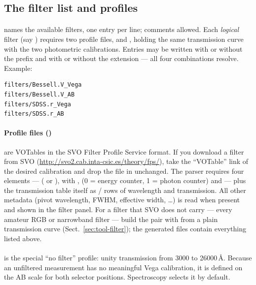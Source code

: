 \subsection{The filter list and profiles}
\label{sec:file-filters}

\paragraph{} names the available filters, one
entry per line; \code{\#} comments allowed. Each \emph{logical} filter
(say ) requires two profile files, 
and , holding the same transmission curve with the two
photometric calibrations. Entries may be written with or without the
 prefix and with or without the  extension ---
all four combinations resolve. Example:

\begin{verbatim}
filters/Bessell.V_Vega
filters/Bessell.V_AB
filters/SDSS.r_Vega
filters/SDSS.r_AB
\end{verbatim}

\paragraph{Profile files ()} are VOTables in the
SVO Filter Profile Service format. If you download a filter from SVO
(\url{http://svo2.cab.inta-csic.es/theory/fps/}), take the ``VOTable''
link of the desired calibration and drop the file in unchanged. The
parser requires four  elements ---  (
or ),  with  ,
 (0 = energy counter, 1 = photon counter) and
 --- plus the transmission table itself as
/ rows of wavelength and transmission. All other
metadata (pivot wavelength, FWHM, effective width, \dots) is read when
present and shown in the filter panel. For a filter that SVO does not
carry --- every amateur RGB or narrowband filter --- build the pair with
 from a plain transmission curve
(Sect.~\ref{sec:tool-filter}); the generated files contain everything
listed above.

\paragraph{} is the special ``no filter'' profile: unity
transmission from 3000 to 26000\,\AA{}. Because an unfiltered measurement
has no meaningful Vega calibration, it is defined on the AB scale for
both selector positions. Spectroscopy selects it by default.

